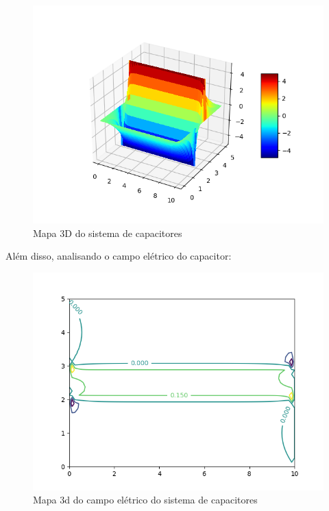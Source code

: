 \documentclass[oneside]{abntex2}
\begin{document}
\begin{figure}[h!]
    \centering
    \includegraphics[scale=0.8]{imgs/3d_aprox_cap_1250.png}
    \caption{Mapa 3D do sistema de capacitores}
    \label{cont_aprox_cap_1250}
\end{figure}

Além disso, analisando o campo elétrico do capacitor:

\begin{figure}[h!]
    \centering
    \includegraphics[scale=0.8]{imgs/cont_aprox_cap_elet_1250.png}
    \caption{Mapa 3d do campo elétrico do sistema de capacitores}
    \label{fig:my_label}
\end{figure}
\end{document}
